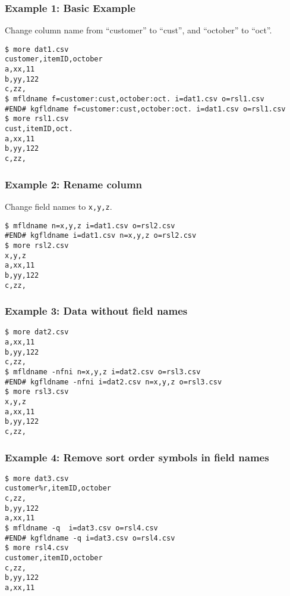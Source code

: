 \subsubsection*{Example 1: Basic Example}

Change column name from “customer” to “cust”, and “october” to “oct”.


\begin{Verbatim}[baselinestretch=0.7,frame=single]
$ more dat1.csv
customer,itemID,october
a,xx,11
b,yy,122
c,zz,
$ mfldname f=customer:cust,october:oct. i=dat1.csv o=rsl1.csv
#END# kgfldname f=customer:cust,october:oct. i=dat1.csv o=rsl1.csv
$ more rsl1.csv
cust,itemID,oct.
a,xx,11
b,yy,122
c,zz,
\end{Verbatim}
\subsubsection*{Example 2: Rename column}

Change field names to \verb|x,y,z|.


\begin{Verbatim}[baselinestretch=0.7,frame=single]
$ mfldname n=x,y,z i=dat1.csv o=rsl2.csv
#END# kgfldname i=dat1.csv n=x,y,z o=rsl2.csv
$ more rsl2.csv
x,y,z
a,xx,11
b,yy,122
c,zz,
\end{Verbatim}
\subsubsection*{Example 3: Data without field names}



\begin{Verbatim}[baselinestretch=0.7,frame=single]
$ more dat2.csv
a,xx,11
b,yy,122
c,zz,
$ mfldname -nfni n=x,y,z i=dat2.csv o=rsl3.csv
#END# kgfldname -nfni i=dat2.csv n=x,y,z o=rsl3.csv
$ more rsl3.csv
x,y,z
a,xx,11
b,yy,122
c,zz,
\end{Verbatim}
\subsubsection*{Example 4: Remove sort order symbols in field names}



\begin{Verbatim}[baselinestretch=0.7,frame=single]
$ more dat3.csv
customer%r,itemID,october
c,zz,
b,yy,122
a,xx,11
$ mfldname -q  i=dat3.csv o=rsl4.csv
#END# kgfldname -q i=dat3.csv o=rsl4.csv
$ more rsl4.csv
customer,itemID,october
c,zz,
b,yy,122
a,xx,11
\end{Verbatim}
